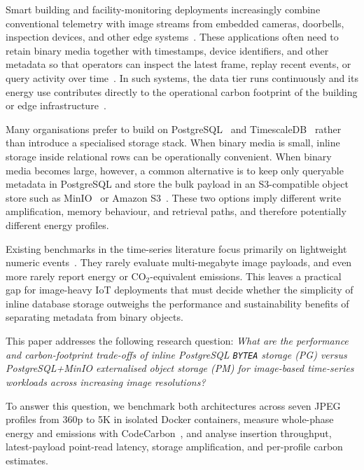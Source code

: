 \documentclass[conference]{IEEEtran}
\begin{document}
Smart building and facility-monitoring deployments increasingly combine conventional telemetry with image streams from embedded cameras, doorbells, inspection devices, and other edge systems~\cite{ieee_ce_definition,intuz_iot_databases}. These applications often need to retain binary media together with timestamps, device identifiers, and other metadata so that operators can inspect the latest frame, replay recent events, or query activity over time~\cite{ceec_tsdb_review,jensen_tsms_survey}. In such systems, the data tier runs continuously and its energy use contributes directly to the operational carbon footprint of the building or edge infrastructure~\cite{nerc_tsdb_survey}.

Many organisations prefer to build on PostgreSQL~\cite{postgresql_official} and TimescaleDB~\cite{timescaledb_official} rather than introduce a specialised storage stack. When binary media is small, inline storage inside relational rows can be operationally convenient. When binary media becomes large, however, a common alternative is to keep only queryable metadata in PostgreSQL and store the bulk payload in an S3-compatible object store such as MinIO~\cite{minio_official} or Amazon S3~\cite{aws_s3_official}. These two options imply different write amplification, memory behaviour, and retrieval paths, and therefore potentially different energy profiles.

Existing benchmarks in the time-series literature focus primarily on lightweight numeric events~\cite{tsbs,cratedb_ts_benchmark,diva_timescaledb_mongodb_eval}. They rarely evaluate multi-megabyte image payloads, and even more rarely report energy or CO$_2$-equivalent emissions. This leaves a practical gap for image-heavy IoT deployments that must decide whether the simplicity of inline database storage outweighs the performance and sustainability benefits of separating metadata from binary objects.

This paper addresses the following research question: \textit{What are the performance and carbon-footprint trade-offs of inline PostgreSQL \texttt{BYTEA} storage (PG) versus PostgreSQL+MinIO externalised object storage (PM) for image-based time-series workloads across increasing image resolutions?}

To answer this question, we benchmark both architectures across seven JPEG profiles from 360p to 5K in isolated Docker containers, measure whole-phase energy and emissions with CodeCarbon~\cite{codecarbon}, and analyse insertion throughput, latest-payload point-read latency, storage amplification, and per-profile carbon estimates.
\end{document}
